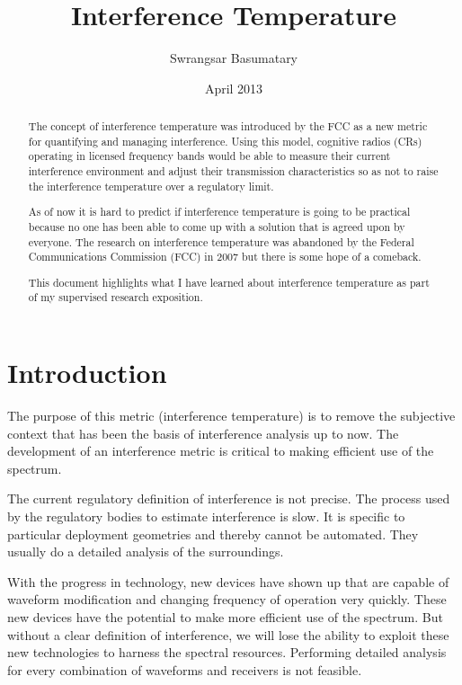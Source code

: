 \documentclass[12pt]{article}
\title{Interference Temperature}
\author{Swrangsar Basumatary}
\date{April 2013}
\begin{document}
\maketitle

\begin{abstract}

The concept of interference temperature was introduced by the FCC as a new metric for quantifying and managing interference. Using this model, cognitive radios (CRs) operating in licensed frequency bands would be able to measure their current interference environment and adjust their transmission characteristics so as not to raise the interference temperature over a regulatory limit.

As of now it is hard to predict if interference temperature is going to be practical because no one has been able to come up with a solution that is agreed upon by everyone. The research on interference temperature was abandoned by the Federal Communications Commission (FCC) in 2007 but there is some hope of a comeback.

This document highlights what I have learned about interference temperature as part of my supervised research exposition.

\end{abstract}

\section{Introduction}

The purpose of this metric (interference temperature) is to remove the subjective context that has been the basis of interference analysis up to now\cite{kolodzy2006}. The development of an interference metric is critical to making efficient use of the spectrum.

The current regulatory definition of interference is not precise. The process used by the regulatory bodies to estimate interference is slow. It is specific to particular deployment geometries and thereby cannot be automated. They usually do a  detailed analysis of the surroundings.

With the progress in technology, new devices have shown up that are capable of waveform modification and changing frequency of operation very quickly. These new devices have the potential to make more efficient use of the spectrum. But without a clear definition of interference, we will lose the ability to exploit these new technologies to harness the spectral resources. Performing detailed analysis for every combination of waveforms and receivers is not feasible.
\end{document}
